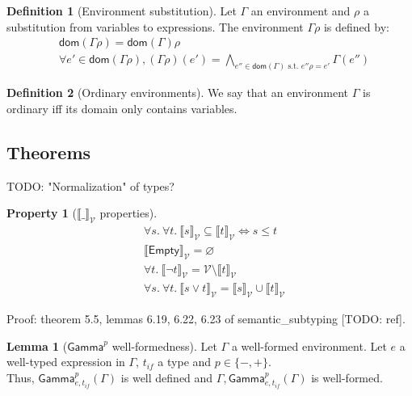 \documentclass[a4paper]{article}%
\newcommand{\dom}[1]{\textsf{dom}(#1)}
\newcommand{\Empty} {\textsf{Empty}}%
\newcommand{\Genv}[3]{\textsf{Gamma}^{#1}_{#2}(#3)}
\newcommand{\Ga}[2]{\textsf{Gamma}^{#1}_{#2}}
\newcommand{\values}[0]{\mathcal{V}}
\newcommand{\valsemantic}[1]{{\llbracket #1 \rrbracket}_{\values}}
\theoremstyle{definition}
\newtheorem{lemma}{Lemma}
\newtheorem{definition}{Definition}
\newtheorem{property}{Property}
\begin{document}
      \begin{definition}[Environment substitution]
        Let $\Gamma$ an environment and $\rho$ a substitution from variables to expressions.
        The environment $\Gamma\rho$ is defined by:
        \begin{align*}
          &\dom {\Gamma\rho} = \dom \Gamma \rho\\
          &\forall e' \in \dom {\Gamma\rho}, (\Gamma\rho)(e') = \bigwedge_{e'' \in \dom \Gamma \text{ s.t. } e''\rho=e'}\Gamma(e'')
        \end{align*}
      \end{definition}
    
      \begin{definition}[Ordinary environments]
        We say that an environment $\Gamma$ is ordinary iff its domain only contains variables.
      \end{definition}
    
        \subsection{Theorems}

        TODO: "Normalization" of types?

        \begin{property}[$\valsemantic \_$ properties]
          \begin{align*}
            &\forall s.\ \forall t.\ \valsemantic s \subseteq \valsemantic t \Leftrightarrow s \leq t\\
            &\valsemantic \Empty = \varnothing\\
            &\forall t.\ \valsemantic {\neg t} = \values \setminus \valsemantic t\\
            &\forall s.\ \forall t.\ \valsemantic {s\vee t} = \valsemantic s \cup \valsemantic t
          \end{align*}
        \end{property}
        Proof: theorem 5.5, lemmas 6.19, 6.22, 6.23 of semantic_subtyping [TODO: ref].

        \begin{lemma}[$\Ga p {} $ well-formedness]
          Let $\Gamma$ a well-formed environment. Let $e$ a well-typed expression in $\Gamma$, $t_{if}$ a type and $p\in\{-,+\}$.\\
          Thus, $\Genv p {e,t_{if}} \Gamma$ is well defined and $\Gamma,\Genv p {e,t_{if}} \Gamma$ is well-formed.
        \end{lemma}
\end{document}
